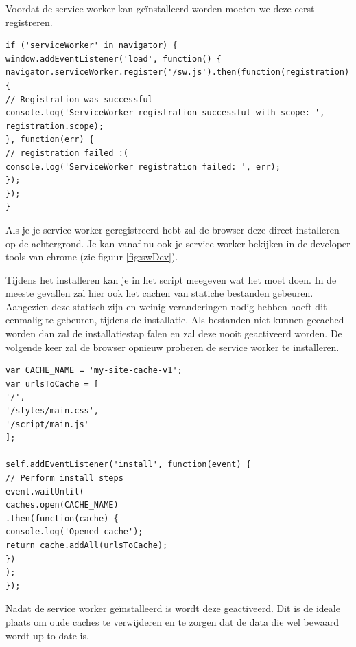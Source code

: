 	Voordat de service worker kan geïnstalleerd worden moeten we deze eerst registreren.
	
\begin{lstlisting}
if ('serviceWorker' in navigator) {
window.addEventListener('load', function() {
navigator.serviceWorker.register('/sw.js').then(function(registration) {
// Registration was successful
console.log('ServiceWorker registration successful with scope: ', registration.scope);
}, function(err) {
// registration failed :(
console.log('ServiceWorker registration failed: ', err);
});
});
}
\end{lstlisting}

Als je je service worker geregistreerd hebt zal de browser deze direct installeren op de achtergrond. Je kan vanaf nu ook je service worker bekijken in de developer tools van chrome (zie figuur \ref{fig:swDev}).

Tijdens het installeren kan je in het script meegeven wat het moet doen. In de meeste gevallen zal hier ook het cachen van statiche bestanden gebeuren. Aangezien deze statisch zijn en weinig veranderingen nodig hebben hoeft dit eenmalig te gebeuren, tijdens de installatie. Als bestanden niet kunnen gecached worden dan zal de installatiestap falen en zal deze nooit geactiveerd worden. De volgende keer zal de browser opnieuw proberen de service worker te installeren.
\begin{lstlisting}
var CACHE_NAME = 'my-site-cache-v1';
var urlsToCache = [
'/',
'/styles/main.css',
'/script/main.js'
];

self.addEventListener('install', function(event) {
// Perform install steps
event.waitUntil(
caches.open(CACHE_NAME)
.then(function(cache) {
console.log('Opened cache');
return cache.addAll(urlsToCache);
})
);
});
\end{lstlisting}


Nadat de service worker geïnstalleerd is wordt deze geactiveerd. Dit is de ideale plaats om oude caches te verwijderen en te zorgen dat de data die wel bewaard wordt up to date is.

